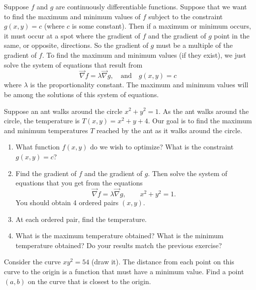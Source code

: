 {\begin{theorem}
Suppose $f$ and $g$ are continuously differentiable functions. Suppose that we want to find the maximum and minimum values of $f$ subject to the constraint $g(x,y)=c$ (where $c$ is some constant).  Then if a maximum or minimum occurs, it must occur at a spot where the gradient of $f$ and the gradient of $g$ point in the same, or opposite, directions. So the gradient of $g$ must be a multiple of the gradient of $f$. To find the maximum and minimum values (if they exist), we just solve the system of equations that result from  
$$\vec \nabla f = \lambda \vec \nabla g,\quad \text{and}\quad g(x,y)=c$$ where $\lambda$ is the proportionality constant. The maximum and minimum values will be among the solutions of this system of equations. 
\end{theorem}

\begin{problem}
 Suppose an ant walks around the circle $x^2+y^2=1$.  As the ant walks around the circle, the temperature is $T(x,y) = x^2+y+4$.  Our goal is to find the maximum and minimum temperatures $T$ reached by the ant as it walks around the circle. 
 \begin{enumerate}
  \item What function $f(x,y)$ do we wish to optimize? What is the constraint $g(x,y)=c$?
  \item {}%
Find the gradient of $f$ and the gradient of $g$.  Then solve the system of equations that you get from the equations $$\vec \nabla f = \lambda \vec \nabla g, \quad \quad x^2+y^2=1.$$ 
  You should obtain 4 ordered pairs $(x,y)$.
  \item At each ordered pair, find the temperature. 
	\item What is the maximum temperature obtained? What is the minimum temperature obtained? Do your results match the previous exercise?
 \end{enumerate}
\end{problem}

\begin{problem}
%
 Consider the curve $xy^2=54$ (draw it). The distance from each point on this curve to the origin is a function that must have a minimum value. Find a point $(a,b)$ on the curve that is closest to the origin.  


\end{problem}}
